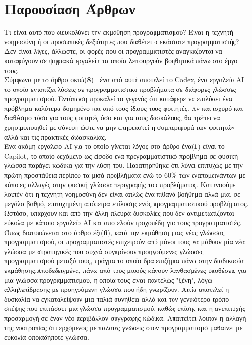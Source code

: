 \documentclass{report}
\begin{document}
\section{Παρουσίαση Άρθρων}
Τι είναι αυτό που διευκολύνει την εκμάθηση προγραμματισμού? Είναι η τεχνητή νοημοσύνη ή οι προσωπικές δεξιότητες που διαθέτει ο εκάστοτε προγραμματιστής? Δεν είναι λίγες, άλλωστε, οι φορές που οι προγραμματιστές αναγκάζονται να καταφύγουν σε ψηφιακά εργαλεία τα οποία λειτουργούν βοηθητικά πάνω στο έργο τους. \\Σύμφωνα με τo άρθρο οκτώ(\textbf{8}) , ένα από αυτά αποτελεί το Codex, ένα εργαλείο ΑΙ το οποίο εντοπίζει λύσεις σε προγραμματιστικά προβλήματα σε διάφορες γλώσσες προγραμματισμού. Εντύπωση προκαλεί το γεγονός ότι κατάφερε να επιλύσει ένα πρόβλημα καλύτερα δομημένο και από τους ίδιους τους φοιτητές. Αν και ισχυρό και διαθέσιμο τόσο για τους φοιτητές όσο και για τους δασκάλους, θα πρέπει να χρησιμοποιηθεί με σύνεση ώστε να μην επηρεαστεί η συμπεριφορά των φοιτητών αλλά και τις πρακτικές διδασκαλίας. \\Ένα ακόμη εργαλείο ΑΙ για το οποίο γίνεται λόγος στο άρθρο ένα(\textbf{1}) είναι το Capilot, το οποίο δεχόμενο ως είσοδο ένα προγραμματιστικό πρόβλημα σε φυσική γλώσσα παράγει κώδικα για την λύση του. Παρατηρήθηκε ότι λύνει επιτυχώς με την πρώτη προσπάθεια περίπου τα μισά προβλήματα ενώ το 60\% των εναπομεινάντων με κάποιες αλλαγές στην φυσική γλώσσα περιγραφής του προβλήματος. Κατανοούμε λοιπόν ότι η τεχνητή νοημοσύνη δεν είναι απλώς ένα πιθανό βοήθημα αλλά μία, σε μεγάλο βαθμό, επιτυχημένη απόπειρα επίλυσης ενός προγραμματιστικού προβλήματος. \\
Ωστόσο, υπάρχουν και από την άλλη πλευρά δυσκολίες που δεν αντιμετωπίζονται εύκολα με κάποιο εργαλείο ΑΙ και αποτελούν τροχοπέδη για τους προγραμματιστές. Όπως διατυπώνεται στο άρθρο έξι(\textbf{6}), κατά την εκμάθηση μιας νέας γλώσσας προγραμματισμού, οι προγραμματιστές επιχειρούν από μόνοι τους να μάθουν μία νέα γλώσσα με στρατηγικές που συχνά συγκρίνουν προηγούμενες γλώσσες προγραμματισμού μεταξύ τους, πράγμα το οποίο δρα επιζήμια πάνω στην διαδικασία εκμάθησης.Αποδεδειγμένα, πάνω από τους μισούς κάνουν λανθασμένες υποθέσεις για μια γλώσσα προγραμματισμού, η οποία τους είναι παντελώς "ξένη", λόγω αλληλεπίδρασης με προηγούμενη γλώσσα που ήδη γνωρίζουν. Αιτία αποτελεί η δυσκολία να εγκαταλείψουν μια παλιά συνήθεια αλλά και τον γενικότερο τρόπο σκέψης που επιτάσσει μια γλώσσα προγραμματισμού, καθώς επίσης και η ανεπιτυχής προσαρμογή σε έναν νέο περιβάλλον συγγραφής κώδικα. Απαιτείται λοιπόν η αλλαγή της νοοτροπίας ότι ερχόμενος με παλαιές γνώσεις στον προγραμματισμό μαθαίνει με ευκολία οποιαδήποτε γλώσσα.  \\
\end{document}
